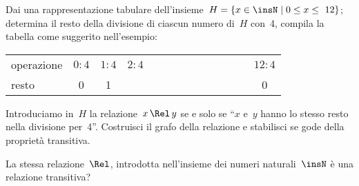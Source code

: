 \begin{esercizio}
\label{ese:B.25}
Dai una rappresentazione tabulare dell'insieme~$H = \{ x \in \insN \mid  0 \le x \le~12 \}$; determina il resto della divisione di ciascun numero di~$H$ con~4,
compila la tabella come suggerito nell'esempio:
\begin{center}
\begin{tabular}{lccccccccccccc}
\toprule
operazione & $0:4$ & $1:4$ & $2:4$ & & & & & & & & & & $12:4$ \\
resto & 0 & 1 & & & & & & & & & & & 0 \\
\bottomrule
\end{tabular}
\end{center}
Introduciamo in~$H$ la relazione~$x \,\Rel\, y$ se e solo se ``$x$ e~$y$ hanno lo stesso resto nella divisione per~4''.
Costruisci il grafo della relazione e stabilisci se gode della proprietà transitiva.

La stessa relazione~$\Rel$, introdotta nell'insieme dei numeri naturali~$\insN$ è una relazione transitiva?
\end{esercizio}


